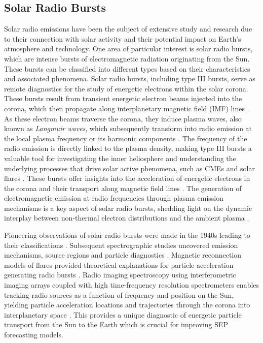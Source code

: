 \subsection{Solar Radio Bursts}
Solar radio emissions have been the subject of extensive study and research due to their connection with solar activity and their potential impact on Earth's atmosphere and technology. One area of particular interest is solar radio bursts, which are intense bursts of electromagnetic radiation originating from the Sun. These bursts can be classified into different types based on their characteristics and associated phenomena. Solar radio bursts, including type III bursts, serve as remote diagnostics for the study of energetic electrons within the solar corona. These bursts result from transient energetic electron beams injected into the corona, which then propagate along interplanetary magnetic field (IMF) lines \citep{ergun_1998, pick_2006, reid_2020}. As these electron beams traverse the corona, they induce plasma waves, also known as \textit{Langmuir waves}, which subsequently transform into radio emission at the local plasma frequency or its harmonic components \citep{melrose_2017}.
The frequency of the radio emission is directly linked to the plasma density, making type III bursts a valuable tool for investigating the inner heliosphere and understanding the underlying processes that drive solar active phenomena, such as CMEs and solar flares \citep{reid_2014, kontar_2017}. These bursts offer insights into the acceleration of energetic electrons in the corona and their transport along magnetic field lines \citep{reid_2014}. The generation of electromagnetic emission at radio frequencies through plasma emission mechanisms is a key aspect of solar radio bursts, shedding light on the dynamic interplay between non-thermal electron distributions and the ambient plasma \citep{melrose_1980}.

Pioneering observations of solar radio bursts were made in the 1940s leading to their classifications \citep{wild_1963}. Subsequent spectrographic studies uncovered emission mechanisms, source regions and particle diagnostics \citep{suzuki_1985}. Magnetic reconnection models of flares provided theoretical explanations for particle acceleration generating radio bursts \citep{holman_2011}. Radio imaging spectroscopy using interferometric imaging arrays coupled with high time-frequency resolution spectrometers enables tracking radio sources as a function of frequency and position on the Sun, yielding particle acceleration locations and trajectories through the corona into interplanetary space \citep{krucker_2011, klassen_2003a, klassen_2003b}. This provides a unique diagnostic of energetic particle transport from the Sun to the Earth which is crucial for improving SEP forecasting models.

